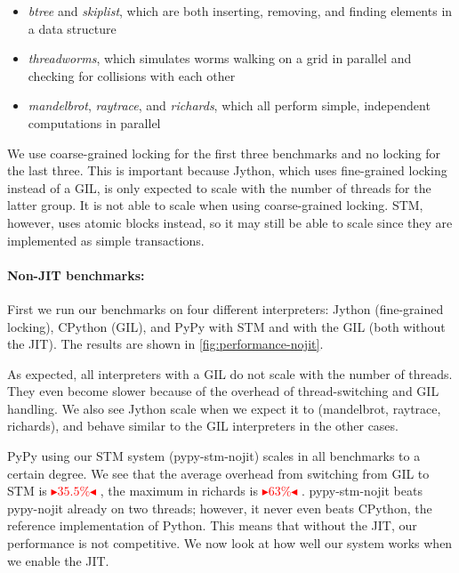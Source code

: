 \documentclass{sigplanconf}
\newcommand{\mynote}[2]{%
  \textcolor{red}{%
    \fbox{\bfseries\sffamily\scriptsize#1}%
    {\small$\blacktriangleright$\textsf{\emph{#2}}$\blacktriangleleft$}%
  }%
}
\newcommand\remi[1]{\mynote{Remi}{#1}}
\begin{document}
\begin{itemize}
\item \emph{btree} and \emph{skiplist}, which are both inserting,
  removing, and finding elements in a data structure
\item \emph{threadworms}, which simulates worms walking on a grid in
  parallel and checking for collisions with each other
\item \emph{mandelbrot}, \emph{raytrace}, and \emph{richards}, which
  all perform simple, independent computations in parallel
\end{itemize}

We use coarse-grained locking for the first three benchmarks and no
locking for the last three. This is important because Jython, which
uses fine-grained locking instead of a GIL, is only expected to scale
with the number of threads for the latter group. It is not able to
scale when using coarse-grained locking. STM, however, uses atomic
blocks instead, so it may still be able to scale since they are
implemented as simple transactions.


\paragraph{Non-JIT benchmarks:} First we run our benchmarks on four
different interpreters: Jython (fine-grained locking), CPython (GIL),
and PyPy with STM and with the GIL (both without the JIT). The results
are shown in \ref{fig:performance-nojit}.

As expected, all interpreters with a GIL do not scale with the number
of threads. They even become slower because of the overhead of
thread-switching and GIL handling. We also see Jython scale when we
expect it to (mandelbrot, raytrace, richards), and behave similar to
the GIL interpreters in the other cases.

PyPy using our STM system (pypy-stm-nojit) scales in all benchmarks to
a certain degree. We see that the average overhead from switching from
GIL to STM is \remi{$35.5\%$}, the maximum in richards is
\remi{$63\%$}. pypy-stm-nojit beats pypy-nojit already on two threads;
however, it never even beats CPython, the reference implementation of
Python. This means that without the JIT, our performance is not
competitive. We now look at how well our system works when we enable
the JIT.
\end{document}
